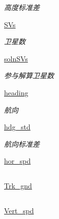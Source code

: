 \begin{DoxyCompactItemize}
\begin{DoxyCompactList}\small\item\em 高度标准差 \end{DoxyCompactList}\item 
\hyperlink{classserial__af__dox_1_1_g_p_s_af59df0c96ca8c602f45dbe3c8ddfe6e0}{S\+Vs}
\begin{DoxyCompactList}\small\item\em 卫星数 \end{DoxyCompactList}\item 
\hyperlink{classserial__af__dox_1_1_g_p_s_a9e19b0e8c4a74bf825a8d32a636732b5}{soln\+S\+Vs}
\begin{DoxyCompactList}\small\item\em 参与解算卫星数 \end{DoxyCompactList}\item 
\hyperlink{classserial__af__dox_1_1_g_p_s_acd368d1a7ba0f60c52e665feae6e8f1a}{heading}
\begin{DoxyCompactList}\small\item\em 航向 \end{DoxyCompactList}\item 
\hyperlink{classserial__af__dox_1_1_g_p_s_ab472ba8f1671312e9ec771f5fcb07a97}{hdg\+\_\+std}
\begin{DoxyCompactList}\small\item\em 航向标准差 \end{DoxyCompactList}\item 
\hyperlink{classserial__af__dox_1_1_g_p_s_a4e895790d21e8b7a0ae769b8f3e338d4}{hor\+\_\+spd}
\begin{DoxyCompactList}\small\item\em \subsection*{}\end{DoxyCompactList}\item 
\hyperlink{classserial__af__dox_1_1_g_p_s_a76fb1df42f635603ce5032b574265cf6}{Trk\+\_\+gnd}
\begin{DoxyCompactList}\small\item\em \subsection*{}\end{DoxyCompactList}\item 
\hyperlink{classserial__af__dox_1_1_g_p_s_ab3792dcf22a15b7157f8e90f52ba7e88}{Vert\+\_\+spd}

\end{DoxyCompactItemize}
